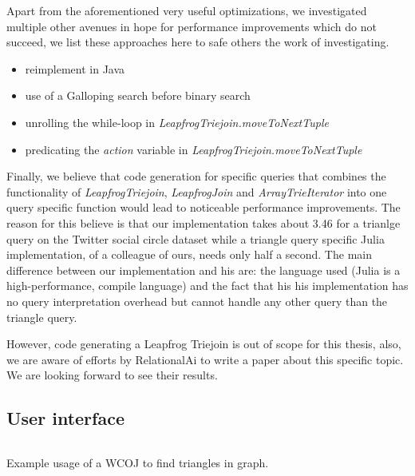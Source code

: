 Apart from the aforementioned very useful optimizations, we investigated multiple other avenues in hope for performance improvements which do not succeed, we list these
approaches here to safe others the work of investigating.

\begin{itemize}
    \item reimplement in Java
    \item use of a Galloping search before binary search
    \item unrolling the while-loop in \textit{LeapfrogTriejoin.moveToNextTuple}
    \item predicating the \textit{action} variable in \textit{LeapfrogTriejoin.moveToNextTuple}
\end{itemize}


Finally, we believe that code generation for specific queries that combines the functionality of \textit{LeapfrogTriejoin}, \textit{LeapfrogJoin}
and \textit{ArrayTrieIterator} into one query specific function would lead to noticeable performance improvements.
The reason for this believe is that our implementation takes about 3.46 for a trianlge query on the Twitter social circle dataset
while a triangle query specific Julia implementation, of a colleague of ours, needs only half a second.
The main difference between our implementation and his are: the language used (Julia is a high-performance, compile language) and the fact
that his his implementation has no query interpretation overhead but cannot handle any other query than the triangle query.

However, code generating a Leapfrog Triejoin is out of scope for this thesis, also, we are aware of efforts by RelationalAi to
write a paper about this specific topic.
We are looking forward to see their results.





\subsection{User interface}\label{subsec:user-interface}
\begin{listing}[H]
    \inputminted{scala}{code/usage-example.scala}
    \caption{Example usage of a WCOJ to find triangles in graph.}
    \label{lst:usage-example}
\end{listing}

